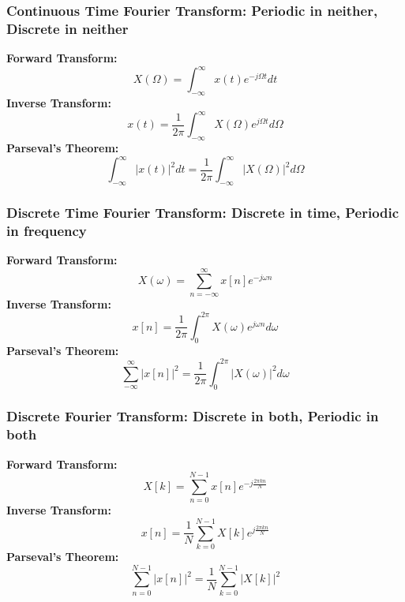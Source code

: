 \documentclass{beamer}
\begin{document}
\begin{frame}
  \frametitle{Continuous Time Fourier Transform: Periodic in neither, Discrete in neither}
  
  \textbf{Forward Transform:}
  \begin{displaymath}
    X(\Omega) = \int_{-\infty}^\infty x(t)e^{-j\Omega t}dt
  \end{displaymath}
  \textbf{Inverse Transform:}
  \begin{displaymath}
    x(t) = \frac{1}{2\pi}\int_{-\infty}^\infty X(\Omega)e^{j\Omega t}d\Omega
  \end{displaymath}
  \textbf{Parseval's Theorem:}
  \begin{displaymath}
    \int_{-\infty}^{\infty}|x(t)|^2dt=\frac{1}{2\pi}\int_{-\infty}^\infty|X(\Omega)|^2d\Omega
  \end{displaymath}
\end{frame}

\begin{frame}
  \frametitle{Discrete Time Fourier Transform: Discrete in time, Periodic in frequency}

  \textbf{Forward Transform:}
  \begin{displaymath}
    X(\omega) = \sum_{n=-\infty}^\infty x[n]e^{-j\omega n}
  \end{displaymath}
  \textbf{Inverse Transform:}
  \begin{displaymath}
    x[n] = \frac{1}{2\pi}\int_{0}^{2\pi} X(\omega)e^{j\omega n}d\omega
  \end{displaymath}
  \textbf{Parseval's Theorem:}
  \begin{displaymath}
    \sum_{-\infty}^{\infty}|x[n]|^2=\frac{1}{2\pi}\int_{0}^{2\pi}|X(\omega)|^2d\omega
  \end{displaymath}
\end{frame}

\begin{frame}
  \frametitle{Discrete Fourier Transform: Discrete in both, Periodic in both}

  \textbf{Forward Transform:}
  \begin{displaymath}
    X[k] = \sum_{n=0}^{N-1} x[n]e^{-j\frac{2\pi kn}{N}}
  \end{displaymath}
  \textbf{Inverse Transform:}
  \begin{displaymath}
    x[n] = \frac{1}{N}\sum_{k=0}^{N-1} X[k]e^{j\frac{2\pi kn}{N}}
  \end{displaymath}
  \textbf{Parseval's Theorem:}
  \begin{displaymath}
    \sum_{n=0}^{N-1}|x[n]|^2=\frac{1}{N}\sum_{k=0}^{N-1}|X[k]|^2
  \end{displaymath}
\end{frame}
\end{document}
